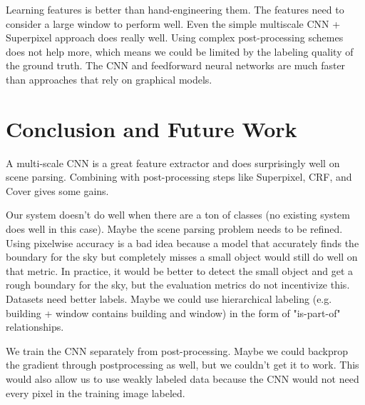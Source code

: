 \documentclass[a4paper]{article}
\begin{document}
Learning features is better than hand-engineering them. The features need to
consider a large window to perform well. Even the simple multiscale CNN +
Superpixel approach does really well. Using complex post-processing schemes
does not help more, which means we could be limited by the labeling quality
of the ground truth. The CNN and feedforward neural networks are much faster
than approaches that rely on graphical models.

\section{Conclusion and Future Work}
A multi-scale CNN is a great feature extractor and does surprisingly well on
scene parsing. Combining with post-processing steps like Superpixel, CRF, and
Cover gives some gains.

Our system doesn't do well when there are a ton of classes (no existing system
does well in this case). Maybe the scene parsing problem needs to be refined.
Using pixelwise accuracy is a bad idea because a model that accurately finds
the boundary for the sky but completely misses a small object would still do
well on that metric. In practice, it would be better to detect the small object
and get a rough boundary for the sky, but the evaluation metrics do not
incentivize this. Datasets need better labels. Maybe we could use hierarchical
labeling (e.g. building + window contains building and window) in the form of
"is-part-of" relationships.

We train the CNN separately from post-processing. Maybe we could backprop
the gradient through postprocessing as well, but we couldn't get it to work.
This would also allow us to use weakly labeled data because the CNN would not
need every pixel in the training image labeled.
\end{document}
